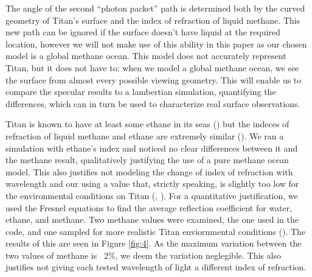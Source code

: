 \documentclass[linenumbers]{aastex631}
\begin{document}
The angle of the second ``photon packet'' path is determined both by the curved geometry of Titan's surface and the index of refraction of liquid methane. This new path can be ignored if the surface doesn't have liquid at the required location, however we will not make use of this ability in this paper as our chosen model is a global methane ocean. This model does not accurately represent Titan, but it does not have to: when we model a global methane ocean, we see the surface from almost every possible viewing geometry. This will enable us to compare the specular results to a lambertian simulation, quantifying the differences, which can in turn be used to characterize real surface observations. 

Titan is known to have at least some ethane in its seas (\cite{Mastrogiuseppe2016}) but the indeces of refraction of liquid methane and ethane are extremely similar (\cite{Kanjanasakul2020}). We ran a simulation with ethane's index and noticed no clear differences between it and the methane result, qualitatively justifying the use of a pure methane ocean model. This also justifies not modeling the change of index of refraction with wavelength and our using a value that, strictly speaking, is slightly too low for the environmental conditions on Titan (\cite{Martonchik1994}, \cite{Jennings2019}). For a quantitative justification, we used the Fresnel equations to find the average reflection coefficient for water, ethane, and methane. Two methane values were examined, the one used in the code, and one sampled for more realistic Titan enviornmental conditions (\cite{Martonchik1994}). The results of this are seen in Figure \ref{fig:4}. As the maximum variation between the two values of methane is ~2\%, we deem the variation neglegible. This also justifies not giving each tested wavelength of light a different index of refraction. 
\end{document}
